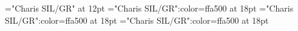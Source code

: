 \documentclass[a4paper]{article}
\begin{document}
\pagestyle{plain}
\sloppy
\setlength{\parfillskip}{0pt plus 1fil}
\font\div="Charis SIL/GR" at 12pt
\font{}="Charis SIL/GR":color=ffa500 at 18pt
\font\entryletHeaddiv="Charis SIL/GR":color=ffa500 at 18pt
\font{}="Charis SIL/GR":color=ffa500 at 18pt

\mbox{} 
\newpage 
\newpage 
\setcounter{page}{1} 
\pagestyle{fancy} 


\end{document}
